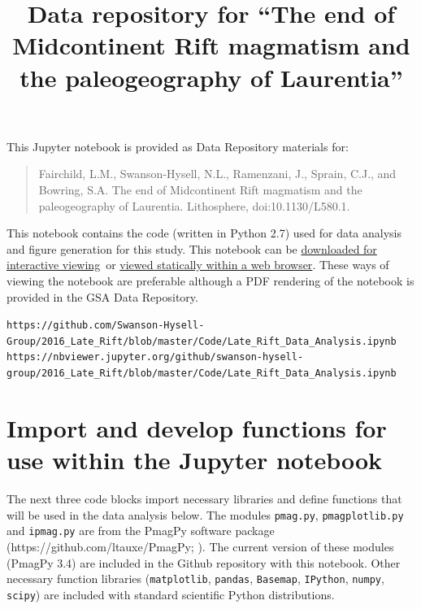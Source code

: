 \documentclass{article}
\title{Data repository for ``The end of Midcontinent Rift magmatism and the paleogeography of Laurentia''}
\date{}
\begin{document}
    
    
    \maketitle
    
    

    
\label{paleomagnetic-data-analysis-of-late-stage-volcanics-from-the-midcontinent-rift}

\noindent This Jupyter notebook is provided as Data Repository materials for:
\begin{quote}
Fairchild, L.M., Swanson-Hysell, N.L., Ramenzani, J., Sprain, C.J., and Bowring, S.A. The end of Midcontinent Rift magmatism and the paleogeography of Laurentia. Lithosphere, doi:10.1130/L580.1.
\end{quote}
This notebook contains the code (written in Python 2.7) used for data analysis and figure generation for this study. This notebook can be \href{https://github.com/Swanson-Hysell-Group/2016_Late_Rift/blob/master/Code/Late_Rift_Data_Analysis.ipynb}{downloaded for interactive viewing}\footnotemark\ or \href{https://nbviewer.jupyter.org/github/swanson-hysell-group/2016_Late_Rift/blob/master/Code/Late_Rift_Data_Analysis.ipynb}{viewed statically within a web browser}\footnotemark . These ways of viewing the notebook are preferable although a PDF rendering of the notebook is provided in the GSA Data Repository.\\

\footnoterule

\noindent\footnotemark[1]\texttt{\scriptsize{https://github.com/Swanson-Hysell-Group/2016\_Late\_Rift/blob/master/Code/Late\_Rift\_Data\_Analysis.ipynb}}
\footnotemark[2]\texttt{\scriptsize{https://nbviewer.jupyter.org/github/swanson-hysell-group/2016\_Late\_Rift/blob/master/Code/Late\_Rift\_Data\_Analysis.ipynb}}

\tableofcontents{}

\section{Import and develop functions for use within the Jupyter notebook}\label{import-and-develop-functions-for-use-within-the-jupyter-notebook}
The next three code blocks import necessary libraries and define functions
that will be used in the data analysis below. The modules
\texttt{pmag.py}, \texttt{pmagplotlib.py} and \texttt{ipmag.py} are from
the PmagPy software package (https://github.com/ltauxe/PmagPy; \citealp{Tauxe2016a}). The
current version of these modules (PmagPy 3.4) are included in the Github
repository with this notebook. Other necessary function libraries
(\texttt{matplotlib}, \texttt{pandas}, \texttt{Basemap},
\texttt{IPython}, \texttt{numpy}, \texttt{scipy}) are included with
standard scientific Python distributions.
\end{document}
